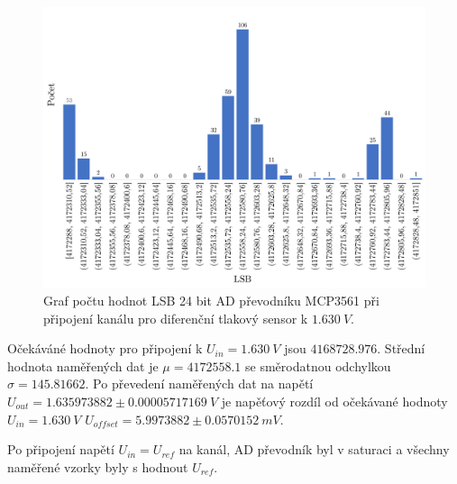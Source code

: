 \begin{figure}[H]
    \caption{Graf počtu hodnot LSB 24 bit AD převodníku MCP3561 při připojení kanálu
        pro diferenční tlakový sensor k  $1.630 \ V$.}
    \includegraphics[width=1\textwidth]{graphs/mcp_16.png}
\end{figure}
Očekáváné hodnoty pro připojení k $U_{in} = 1.630 \ V$ jsou $4168728.976$. Střední hodnota naměřených dat je $\mu = 4172558.1$ se směrodatnou odchylkou $\sigma = 145.81662$. Po převedení naměřených dat na napětí $U_{out} = 1.635973882 \pm 0.00005717169\ V$ je napěťový rozdíl od očekávané hodnoty $U_{in} = 1.630 \ V$
$U_{offset} = 5.9973882 \pm 0.0570152 \ mV$.
\par
Po připojení napětí $U_{in} = U_{ref}$ na kanál, AD převodník byl v saturaci a všechny naměřené vzorky byly s hodnout $U_{ref}$.
